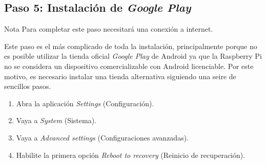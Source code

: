 \documentclass[letterpaper,10.5pt]{article}
\begin{document}
%
%
\subsection{Paso 5: Instalación de \emph{Google Play}}%
\begin{yellowbox}{Nota}
Para completar este paso necesitará una conexión a internet.
\end{yellowbox}
\medskip{}

Este paso es el más complicado de toda la instalación, principalmente porque no es posible utilizar la tienda oficial \emph{Google Play} de Android ya que la Raspberry Pi no se considera un dispositivo comercializable con Android licenciable.
Por este motivo, es necesario instalar una tienda alternativa siguiendo una seire de sencillos pasos.

\begin{enumerate}
	\item Abra la aplicación \emph{Settings} (Configuración).
	\item Vaya a \emph{System} (Sistema).
	\item Vaya a \emph{Advanced settings} (Configuraciones avanzadas).
	\item Habilite la primera opción \emph{Reboot to recovery} (Reinicio de recuperación).
\end{enumerate}
\end{document}
